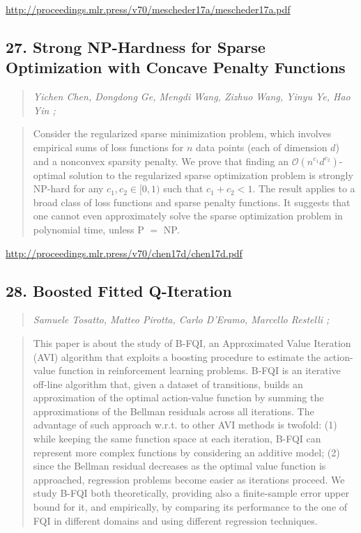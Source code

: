 \documentclass{article}
\begin{document}
\href{http://proceedings.mlr.press/v70/mescheder17a/mescheder17a.pdf}{http://proceedings.mlr.press/v70/mescheder17a/mescheder17a.pdf}

\subsection{27. Strong NP-Hardness for Sparse Optimization with Concave Penalty Functions}

\begin{quote}
\footnotesize{\textit{Yichen Chen, Dongdong Ge, Mengdi Wang, Zizhuo Wang, Yinyu Ye, Hao Yin ;}}
\end{quote}

\begin{quote}
    Consider the regularized sparse minimization problem, which involves empirical sums of loss functions for $n$ data points (each of dimension $d$) and a nonconvex sparsity penalty. We prove that finding an $\mathcal{O}(n^{c_1}d^{c_2})$-optimal solution to the regularized sparse optimization problem is strongly NP-hard for any $c_1, c_2\in [0,1)$ such that $c_1+c_2<1$. The result applies to a broad class of loss functions and sparse penalty functions. It suggests that one cannot even approximately solve the sparse optimization problem in polynomial time, unless P $=$ NP.  \end{quote}

\href{http://proceedings.mlr.press/v70/chen17d/chen17d.pdf}{http://proceedings.mlr.press/v70/chen17d/chen17d.pdf}

\subsection{28. Boosted Fitted Q-Iteration}

\begin{quote}
\footnotesize{\textit{Samuele Tosatto, Matteo Pirotta, Carlo D’Eramo, Marcello Restelli ;}}
\end{quote}

\begin{quote}
    This paper is about the study of B-FQI, an Approximated Value Iteration (AVI) algorithm that exploits a boosting procedure to estimate the action-value function in reinforcement learning problems. B-FQI is an iterative off-line algorithm that, given a dataset of transitions, builds an approximation of the optimal action-value function by summing the approximations of the Bellman residuals across all iterations. The advantage of such approach w.r.t. to other AVI methods is twofold: (1) while keeping the same function space at each iteration, B-FQI can represent more complex functions by considering an additive model; (2) since the Bellman residual decreases as the optimal value function is approached, regression problems become easier as iterations proceed. We study B-FQI both theoretically, providing also a finite-sample error upper bound for it, and empirically, by comparing its performance to the one of FQI in different domains and using different regression techniques.  \end{quote}
\end{document}
